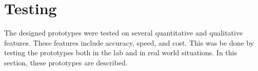 \newpage
\section{Testing} \label{testing}
The designed prototypes were tested on several quantitative and qualitative features. These features include accuracy, speed, and cost. This was be done by testing the prototypes both in the lab and in real world situations. In this section, these prototypes are described.


